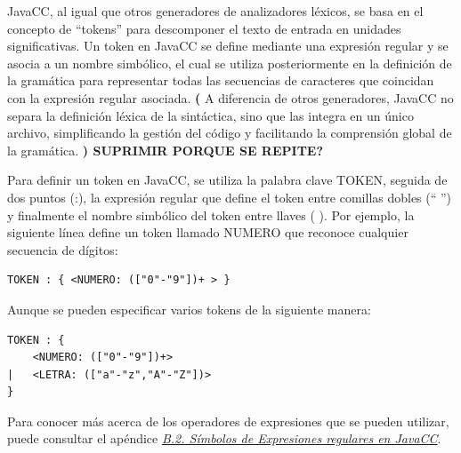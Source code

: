 

JavaCC, al igual que otros generadores de analizadores léxicos, se basa en el concepto de ``tokens'' para descomponer el texto de entrada en unidades significativas. Un token en JavaCC se define mediante una expresión regular y se asocia a un nombre simbólico, el cual se utiliza posteriormente en la definición de la gramática para representar todas las secuencias de caracteres que coincidan con la expresión regular asociada. \textbf{(} A diferencia de otros generadores, JavaCC no separa la definición léxica de la sintáctica, sino que las integra en un único archivo, simplificando la gestión del código y facilitando la comprensión global de la gramática. \textbf{) SUPRIMIR PORQUE SE REPITE?}

Para definir un token en JavaCC, se utiliza la palabra clave TOKEN, seguida de dos puntos (:), la expresión regular que define el token entre comillas dobles (`` '') y finalmente el nombre simbólico del token entre llaves ({ }). Por ejemplo, la siguiente línea define un token llamado NUMERO que reconoce cualquier secuencia de dígitos:

\lstset{inputencoding=utf8/latin1}
\begin{lstlisting}
TOKEN : { <NUMERO: (["0"-"9"])+ > } 
\end{lstlisting}

Aunque se pueden especificar varios tokens de la siguiente manera:

\lstset{inputencoding=utf8/latin1}
\begin{lstlisting}
TOKEN : {
	<NUMERO: (["0"-"9"])+>
|	<LETRA: (["a"-"z","A"-"Z"])>
}
\end{lstlisting}

Para conocer más acerca de los operadores de expresiones que se pueden utilizar, puede consultar el apéndice \hyperref[sec:simbolosdeexpresionesregulares]{\textit{B.2. Símbolos de Expresiones regulares en JavaCC}}.

